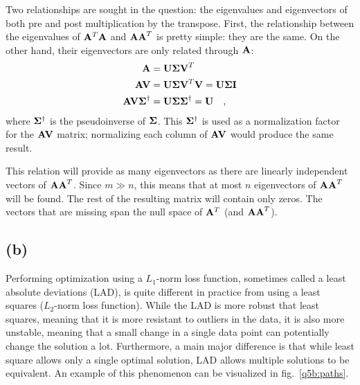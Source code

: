 \documentclass{report}
\begin{document}
Two relationships are sought in the question: the eigenvalues and eigenvectors of both pre and post multiplication by the transpose. First, the relationship between the eigenvalues of $\mathbf{A}^T\mathbf{A}$ and $\mathbf{AA}^T$ is pretty simple: they are the same. On the other hand, their eigenvectors are only related through $\mathbf{A}$:
\begin{align*}
\mathbf{A}  &= \mathbf{U \Sigma V}^T \\
\mathbf{AV} &= \mathbf{U \Sigma V}^T \mathbf{V} = \mathbf{U \Sigma I} \\
\mathbf{AV\Sigma}^\dagger &= \mathbf{U \Sigma \Sigma}^\dagger = \mathbf{U} \quad,
\end{align*}
where $\mathbf{\Sigma}^\dagger$ is the pseudoinverse of $\mathbf{\Sigma}$. This $\mathbf{\Sigma}^\dagger$ is used as a normalization factor for the $\mathbf{AV}$ matrix; normalizing each column of $\mathbf{AV}$ would produce the same result.

This relation will provide as many eigenvectors as there are linearly independent vectors of $\mathbf{AA}^T$. Since $m \gg n$, this means that at most $n$ eigenvectors of $\mathbf{AA}^T$ will be found. The rest of the resulting matrix will contain only zeros. The vectors that are missing span the null space of $\mathbf{A}^T$ (and $\mathbf{AA}^T$).

\subsection{(b)}

Performing optimization using a $L_1$-norm loss function, sometimes called a least absolute deviations (LAD), is quite different in practice from using a least squares ($L_2$-norm loss function). While the LAD is more robust that least squares, meaning that it is more resistant to outliers in the data, it is also more unstable, meaning that a small change in a single data point can potentially change the solution a lot. Furthermore, a main major difference is that while least square allows only a single optimal solution, LAD allows multiple solutions to be equivalent. An example of this phenomenon can be visualized in fig.~\ref{q5b:paths}.
\end{document}
